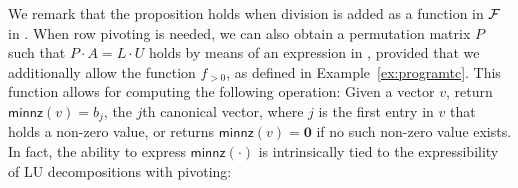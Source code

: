 We remark that the proposition holds when division is added as a function in $\mathcal{F}$
in \langfor. When row pivoting is needed, we can also obtain a permutation matrix
$P$ such that $P\cdot A=L\cdot U$ holds by means of an expression in \langfor, provided
that we additionally allow the function $f_{>0}$, as defined in Example~\ref{ex:programtc}. This function allows for computing the following
operation: Given a vector $v$, return $\mathsf{minnz}(v)=b_j$, the $j$th canonical vector, where $j$ is the first entry in $v$ that holds a non-zero value, or returns $\mathsf{minnz}(v)=\mathbf{0}$ if no such non-zero value exists. In fact, the ability to express
$\mathsf{minnz}(\cdot)$ is intrinsically tied to the expressibility of LU decompositions with pivoting:

%
%

%

